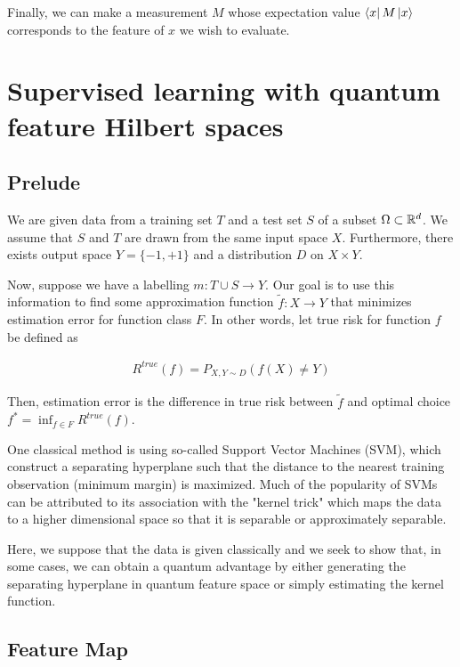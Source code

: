 \documentclass[main.tex]{subfiles}
\begin{document}
{Finally, we can make a measurement $M$ whose expectation value $\bra{x}M\ket{x}$ corresponds to the feature of $x$ we wish to evaluate. 

\section{Supervised learning with quantum feature Hilbert spaces}
\cite{havlicek2018supervised}

\subsection{Prelude}

We are given data from a training set $T$ and a test set $S$ of a subset $\Omega \subset \mathbb{R}^d$. We assume that $S$ and $T$ are drawn from the same input space $X$. Furthermore, there exists output space $Y = \{ -1, +1 \} $ and a distribution $D$ on $X \times Y$.

Now, suppose we have a labelling $m: T \cup S \rightarrow Y$.  Our goal is to use this information to find some approximation function $\tilde{f} : X \rightarrow Y$ that minimizes estimation error for function class $F$. In other words, let true risk for function $f$ be defined as

\begin{align*}
R^{true}(f) = P_{X, Y \sim D}(f(X) \neq Y)	
\end{align*}

Then, estimation error is the difference in true risk between $\tilde{f}$ and optimal choice $f^* = \inf_{f \in F}R^{true}(f)$.

One classical method is using so-called Support Vector Machines (SVM), which construct a separating hyperplane such that the distance to the nearest training observation (minimum margin) is maximized. Much of the popularity of SVMs can be attributed to its association with the "kernel trick" which maps the data to a higher dimensional space so that it is separable or approximately separable.

Here, we suppose that the data is given classically and we seek to show that, in some cases, we can obtain a quantum advantage by either generating the separating hyperplane in quantum feature space or simply estimating the kernel function.

\subsection{Feature Map}

}
\end{document}
